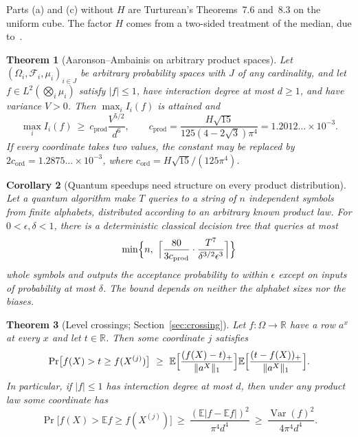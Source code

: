 \documentclass[11pt]{article}
\numberwithin{equation}{section}
\newtheorem{theorem}{Theorem}[section]
\newtheorem{corollary}[theorem]{Corollary}
\theoremstyle{definition}
\theoremstyle{remark}
\newcommand{\E}{\mathbb{E}}
\newcommand{\R}{\mathbb{R}}
\newcommand{\1}{\mathbf 1}
\newcommand{\Var}{\operatorname{Var}}
\newcommand{\cprod}{c_{\mathrm{prod}}}
\newcommand{\cord}{c_{\mathrm{ord}}}
\newcommand{\nrm}[1]{\lVert #1\rVert_1}
\begin{document}
Parts (a) and (c) without $H$ are Turturean's Theorems~7.6 and~8.3 on the uniform cube. The factor $H$ comes from a two-sided treatment of the median, due to~\cite{Wri26}.

\begin{theorem}[Aaronson--Ambainis on arbitrary product spaces]\label{thm:AA}
Let $(\Omega_i,\mathcal F_i,\mu_i)_{i\in J}$ be arbitrary probability spaces with $J$ of any cardinality, and let $f\in L^2(\bigotimes_i\mu_i)$ satisfy $|f|\le1$, have interaction degree at most $d\ge1$, and have variance $V>0$. Then $\max_iI_i(f)$ is attained and
\[
\max_iI_i(f)\ \ge\ \cprod\frac{V^{5/2}}{d^6},\qquad \cprod=\frac{H\sqrt{15}}{125(4-2\sqrt3)\pi^4}=1.2012\ldots\times10^{-3}.
\]
If every coordinate takes two values, the constant may be replaced by $2\cord=1.2875\ldots\times10^{-3}$, where $\cord=H\sqrt{15}/(125\pi^4)$.
\end{theorem}

\begin{corollary}[Quantum speedups need structure on every product distribution]\label{cor:quantum}
Let a quantum algorithm make $T$ queries to a string of $n$ independent symbols from finite alphabets, distributed according to an arbitrary known product law. For $0<\epsilon,\delta<1$, there is a deterministic classical decision tree that queries at most
\[
\min\Bigl\{n,\ \Bigl\lceil\frac{80}{3\cprod}\cdot\frac{T^7}{\delta^{3/2}\epsilon^3}\Bigr\rceil\Bigr\}
\]
whole symbols and outputs the acceptance probability to within $\epsilon$ except on inputs of probability at most $\delta$. The bound depends on neither the alphabet sizes nor the biases.
\end{corollary}

\begin{theorem}[Level crossings; Section~\ref{sec:crossing}]\label{thm:crossintro}
Let $f:\Omega\to\R$ have a row $a^x$ at every $x$ and let $t\in\R$. Then some coordinate $j$ satisfies
\[
\Pr\bigl[f(X)>t\ge f(X^{(j)})\bigr]\ \ge\ \E\Bigl[\frac{(f(X)-t)_+}{\nrm{a^X}}\Bigr]\E\Bigl[\frac{(t-f(X))_+}{\nrm{a^X}}\Bigr].
\]
In particular, if $|f|\le1$ has interaction degree at most $d$, then under any product law some coordinate has
\[
\Pr\bigl[f(X)>\E f\ge f(X^{(j)})\bigr]\ \ge\ \frac{(\E|f-\E f|)^2}{\pi^4d^4}\ \ge\ \frac{\Var(f)^2}{4\pi^4d^4}.
\]
\end{theorem}
\end{document}
